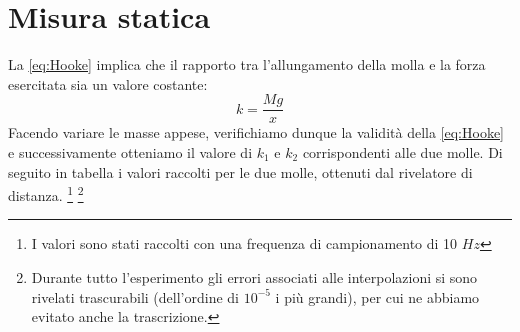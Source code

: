 \section{Misura statica}

La \ref{eq:Hooke} implica che il rapporto tra l'allungamento della molla e la forza esercitata sia un valore costante:
$$k=\frac{Mg}{x}$$
Facendo variare le masse appese, verifichiamo dunque la validità della \ref{eq:Hooke} e successivamente otteniamo il valore di $k_1$ e $k_2$ corrispondenti alle due molle.   
Di seguito in tabella i valori raccolti per le due molle, ottenuti dal rivelatore di distanza. \footnote{I valori sono stati raccolti con una frequenza di campionamento di 10 $Hz$}
\footnote{Durante tutto l'esperimento gli errori associati alle interpolazioni si sono rivelati trascurabili (dell'ordine di $10^{-5}$ i più grandi), per cui ne abbiamo evitato anche la trascrizione.}

